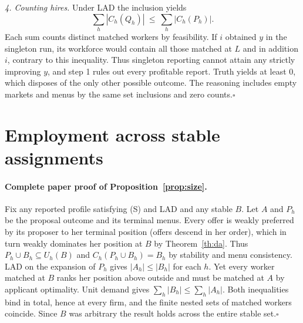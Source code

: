 \documentclass[11pt]{article}
\begin{document}
\textit{4. Counting hires.}
Under LAD the inclusion yields
\[
 \sum_h |C_h(Q_h)|\ \leq\ \sum_h |C_h(P_h)|.
\]
Each sum counts distinct matched workers by feasibility. If $i$ obtained $y$ in the singleton run, its workforce would contain all those matched at $L$ and in addition $i$, contrary to this inequality. Thus singleton reporting cannot attain any strictly improving $y$, and step 1 rules out every profitable report. Truth yields at least $0$, which disposes of the only other possible outcome. The reasoning includes empty markets and menus by the same set inclusions and zero counts.\hfill$\square$

\section{Employment across stable assignments}\label{app:size}
\paragraph{Complete paper proof of Proposition~\ref{prop:size}.}
Fix any reported profile satisfying (S) and LAD and any stable $B$. Let $A$ and $P_h$ be the proposal outcome and its terminal menus. Every offer is weakly preferred by its proposer to her terminal position (offers descend in her order), which in turn weakly dominates her position at $B$ by Theorem~\ref{th:da}. Thus $P_h\cup B_h\subseteq U_h(B)$ and $C_h(P_h\cup B_h)=B_h$ by stability and menu consistency. LAD on the expansion of $P_h$ gives $|A_h|\leq |B_h|$ for each $h$. Yet every worker matched at $B$ ranks her position above outside and must be matched at $A$ by applicant optimality. Unit demand gives $\sum_h |B_h|\leq\sum_h |A_h|$. Both inequalities bind in total, hence at every firm, and the finite nested sets of matched workers coincide. Since $B$ was arbitrary the result holds across the entire stable set.\hfill$\square$
\end{document}
